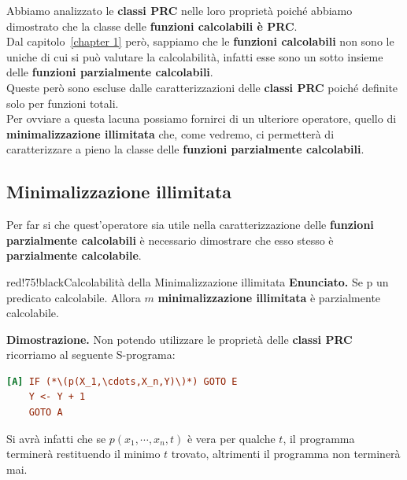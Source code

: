 Abbiamo analizzato le \textbf{classi PRC} nelle loro proprietà poiché abbiamo dimostrato che la classe delle \textbf{funzioni calcolabili è PRC}. \\
Dal capitolo~\ref{chapter 1} però, sappiamo che le \textbf{funzioni calcolabili} non sono le uniche di cui si può valutare la calcolabilità, infatti esse sono un sotto insieme delle \textbf{funzioni parzialmente calcolabili}.\\
Queste però sono escluse dalle caratterizzazioni delle \textbf{classi PRC} poiché definite solo per funzioni totali.\\
Per ovviare a questa lacuna possiamo fornirci di un ulteriore operatore, quello di \textbf{minimalizzazione illimitata} che, come vedremo, ci permetterà di caratterizzare a pieno la classe delle \textbf{funzioni parzialmente calcolabili}.

\subsection{Minimalizzazione illimitata}


Per far si che quest'operatore sia utile nella caratterizzazione delle \textbf{funzioni parzialmente calcolabili} è necessario dimostrare che esso stesso è \textbf{parzialmente calcolabile}.

\begin{halfframedbox}{red!75!black}{Calcolabilità della Minimalizzazione illimitata}\label{Calcolabilità Minimalizzazione illimitata}
  \textbf{Enunciato.} Se p un predicato calcolabile. Allora \(m\) \textbf{minimalizzazione illimitata} è parzialmente calcolabile.

  \begin{center}
    \textcolor{red!75!black}{\hdashrule[0.5ex]{18cm}{1pt}{3mm 3pt 1mm 2pt}}
  \end{center}

  \textbf{Dimostrazione.} Non potendo utilizzare le proprietà delle \textbf{classi PRC} ricorriamo al seguente S-programa:
\begin{lstlisting}[language=ini, label={Minimalizzazione illimitata Dim}, caption={Minimalizzazione illimitata}]
[A] IF (*\(p(X_1,\cdots,X_n,Y)\)*) GOTO E
    Y <- Y + 1
    GOTO A
\end{lstlisting}

  Si avrà infatti che se \(p(x_1,\cdots,x_n,t)\) è vera per qualche \(t\), il programma terminerà restituendo il minimo \(t\)  trovato, altrimenti il programma non terminerà mai.
\end{halfframedbox}

